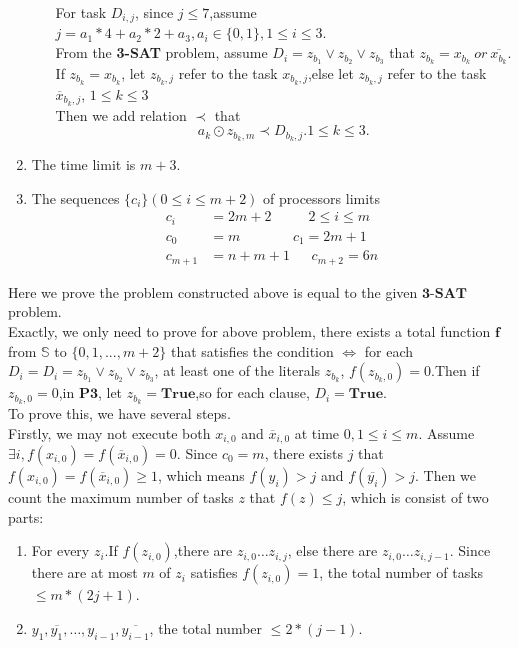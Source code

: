 \begin{enumerate}
\begin{enumerate}
         For task $D_{i,j}$, since $j\le 7$,assume $j=a_1*4+a_2*2+a_3,a_i\in\{0,1\},1\le i\le 3$. \\
        From the \textbf{3-SAT} problem, assume $D_i=z_{b_1}\vee z_{b_2}\vee z_{b_3}$ that $z_{b_k}=x_{b_k}~or~\overline{x_{b_k}}$. If $z_{b_k}=x_{b_k}$, let $z_{{b_k},j}$ refer to the task $x_{{b_k},j}$,else let $z_{{b_k},j}$ refer to the task $\overline{x}_{{b_k},j}$, $1\le k \le 3$\\
        Then we add relation $\prec$ that
        \begin{equation}
            a_{k}\odot z_{{b_k},m}\prec D_{{b_k},j}. 1\le k \le 3.
        \end{equation}
    \end{enumerate}
        \item The time limit is $m+3$.
        \item The sequences $\{c_i\}(0\le i\le m+2)$ of processors limits
        \begin{equation}
            \begin{aligned}
            c_i&=2m+2~~~~~~~~~~~~2\le i \le m\\
            c_0&=m~~~~~~~~~~~~~~~~~c_1=2m+1\\
            c_{m+1}&=n+m+1~~~~~~~c_{m+2}=6n
            \end{aligned}
        \end{equation}
\end{enumerate}
Here we prove the problem constructed above is equal to the given $\textbf{3-SAT}$ problem.\\
    Exactly, we only need to prove for above problem, there exists 
    a total function $\mathbf{f}$ from $\mathbb{S}$ to $\{0, 1,..., m+2\}$ that satisfies the condition $\Leftrightarrow$ for each $D_i=D_i=z_{b_1}\vee z_{b_2}\vee z_{b_3}$, at least one of the literals $z_{b_k}$, $f(z_{b_k,0})=0$.Then if $z_{b_k,0}=0$,in $\textbf{P3}$, let $z_{b_k}=\textbf{True}$,so for each clause, $D_i=\textbf{True}$.\\
    To prove this, we have several steps.\\
    Firstly, we may not execute both $x_{i,0}$ and $\overline{x}_{i,0}$ at time $0,1\le i\le m$. Assume $\exists i,f(x_{i,0})=f(\overline{x}_{i,0})=0$. Since $c_0=m$, there exists $j$ that $f(x_{i,0})=f(\overline{x}_{i,0})\ge 1$, which means $f(y_i)>j$  and $f(\overline{y_i})>j$. Then we count the maximum number of tasks $z$ that $f(z)\le j$, which is consist of two parts:
    \begin{enumerate}
        \item For every $z_i$.If $f(z_{i,0})$,there are $z_{i,0}\dots z_{i,j}$, else there are $z_{i,0}\dots z_{i,j-1}$. Since there are at most $m$ of $z_i$ satisfies $f(z_{i,0})=1$, the total number of tasks $\le m*(2j+1)$.
        \item $y_1,\overline{y_1},\dots, y_{i-1},\overline{y_{i-1}}$, the total number $\le 2*(j-1)$.
    \end{enumerate}
